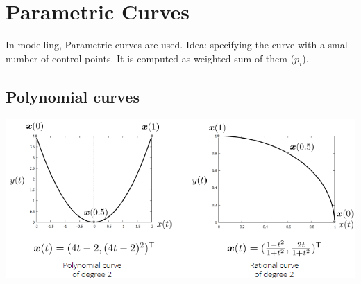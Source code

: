 \documentclass{article}
\begin{document}
\section{Parametric Curves}
In modelling, Parametric curves are used. Idea: specifying the curve with a small number of control points. It is computed as weighted sum of them ($p_i$).\\
\subsection{Polynomial curves}
\includegraphics[scale=0.6]{image63.png}
\end{document}
